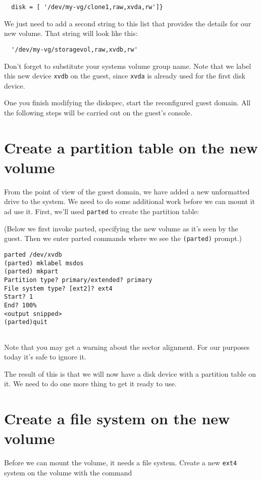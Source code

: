 \documentclass{article}
\begin{document}
\begin{verbatim}
  disk = [ '/dev/my-vg/clone1,raw,xvda,rw']}
\end{verbatim}

We just need to add a second string to this list that provides the details for our new volume. That string will look like this:

\begin{verbatim}
  '/dev/my-vg/storagevol,raw,xvdb,rw'
\end{verbatim}

Don't forget to substitute your systems volume group name. Note that we label this new device \texttt{xvdb} on the guest, since \texttt{xvda} is already used for the first disk device.

One you finish modifying the diskspec, start the reconfigured guest domain. All the following steps will be carried out on the guest's console.

\section{Create a partition table on the new volume}

From the point of view of the guest domain, we have added a new unformatted drive to the system. We need to do some additional work before we can mount it ad use it. First, we'll used \texttt{parted} to create the partition table:

(Below we first invoke parted, specifying the new volume as it's seen by the guest. Then we enter parted commands where we see the \texttt{(parted)} prompt.)

\begin{verbatim}
parted /dev/xvdb
(parted) mklabel msdos
(parted) mkpart
Partition type? primary/extended? primary 
File system type? [ext2]? ext4 
Start? 1 
End? 100%
<output snipped>
(parted)quit


\end{verbatim}

Note that you may get a warning about the sector alignment. For our purposes today it's safe to ignore it.

The result of this is that we will now have a disk device with a partition table on it. We need to do one more thing to get it ready to use.

\section{Create a file system on the new volume}
Before we can mount the volume, it needs a file system. Create a new \texttt{ext4} system on the volume with the command
 
\end{document}
